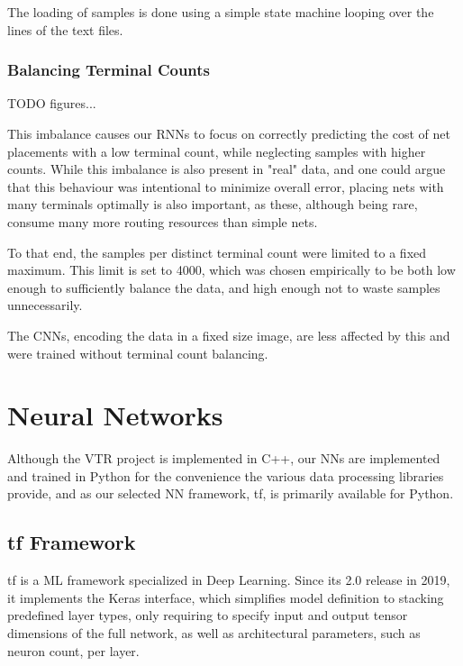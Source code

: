 The loading of samples is done using a simple state machine looping over the lines of the text files.

\subsubsection{Balancing Terminal Counts}

TODO figures...

This imbalance causes our \glspl{RNN}\cite{TODO only lstms} to focus on correctly predicting the cost of net placements with a low terminal count, while neglecting samples with higher counts. While this imbalance is also present in "real" data, and one could argue that this behaviour was intentional to minimize overall error, placing nets with many terminals optimally is also important, as these, although being rare, consume many more routing resources than simple nets.

To that end, the samples per distinct terminal count were limited to a fixed maximum. This limit is set to 4000, which was chosen empirically to be both low enough to sufficiently balance the data, and high enough not to waste samples unnecessarily.

The \glspl{CNN}, encoding the data in a fixed size image, are less affected by this and were trained without terminal count balancing.

\section{Neural Networks}

Although the \gls{VTR} project is implemented in C++, our \glspl{NN} are implemented and trained in Python for the convenience the various data processing libraries provide, and as our selected \gls{NN} framework, \gls{tf}, is primarily available for Python.

\subsection{\gls{tf} Framework}

\gls{tf} is a \gls{ML} framework specialized in Deep Learning.\cite{tensorflow2015-whitepaper} Since its 2.0 release in 2019, it implements the Keras interface\cite{chollet2015keras}, which simplifies model definition to stacking predefined layer types, only requiring to specify input and output tensor dimensions of the full network, as well as architectural parameters, such as neuron count, per layer.

